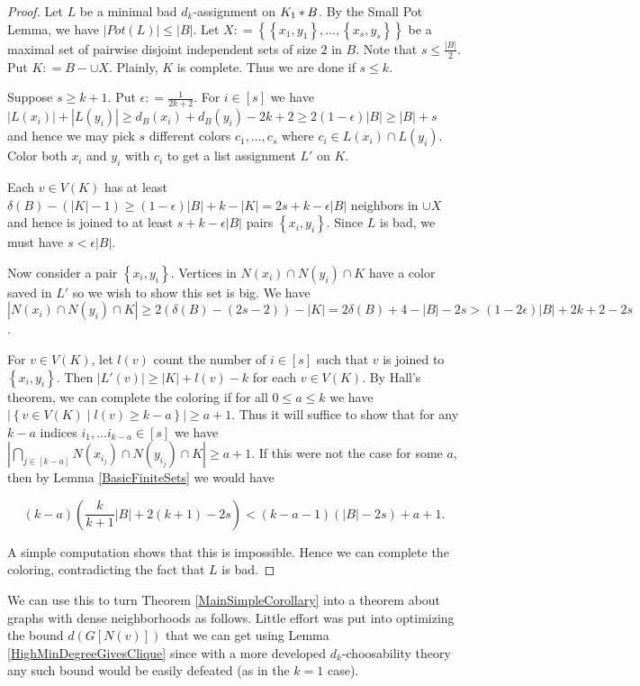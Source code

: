 \documentclass[12pt]{article}
\theoremstyle{plain}
\theoremstyle{definition}
\theoremstyle{remark}
\newcommand{\set}[1]{\left\{ #1 \right\}}
\newcommand{\setb}[3]{\left\{ #1 \in #2 \mid #3 \right\}}
\newcommand{\card}[1]{\left|#1\right|}
\newcommand{\irange}[1]{\left[#1\right]}
\newcommand{\join}[2]{#1 \mbox{\hspace{2 pt}$\ast$\hspace{2 pt}} #2}
\newcommand{\parens}[1]{\left( #1 \right)}
\newcommand{\DefinedAs}{\mathrel{\mathop:}=}
\begin{document}
\begin{proof}
Let $L$ be a minimal bad $d_k$-assignment on $\join{K_1}{B}$. By the Small Pot Lemma, we have $\card{Pot(L)} \leq \card{B}$. Let $X \DefinedAs \set{\set{x_1, y_1}, \ldots, \set{x_s, y_s}}$ be a maximal set of pairwise disjoint independent sets of size $2$ in $B$.  Note that $s \leq \frac{\card{B}}{2}$.  Put $K \DefinedAs B - \cup X$.  Plainly, $K$ is complete.  Thus we are done if $s \leq k$.

Suppose $s \geq k + 1$.  Put $\epsilon \DefinedAs \frac{1}{2k + 2}$. For $i \in \irange{s}$ we have $\card{L(x_i)} + \card{L(y_i)} \geq d_B(x_i) + d_B(y_i) - 2k + 2 \geq 2(1-\epsilon)\card{B} \geq \card{B} + s$ and hence we may pick $s$ different colors $c_1, \ldots, c_s$ where $c_i \in L(x_i) \cap L(y_i)$.  Color both $x_i$ and $y_i$ with $c_i$ to get a list assignment $L'$ on $K$.

Each $v \in V(K)$ has at least $\delta(B) - (\card{K} - 1) \geq (1-\epsilon)\card{B} + k - \card{K} = 2s + k - \epsilon\card{B}$ neighbors in $\cup X$ and hence is joined to at least $s + k - \epsilon\card{B}$ pairs $\set{x_i, y_i}$.  Since $L$ is bad, we must have $s < \epsilon\card{B}$.

Now consider a pair $\set{x_i, y_i}$.  Vertices in $N(x_i) \cap N(y_i) \cap K$ have a color saved in $L'$ so we wish to show this set is big.  We have $\card{N(x_i) \cap N(y_i) \cap K} \geq 2(\delta(B) - (2s - 2)) - \card{K} = 2\delta(B) + 4 - \card{B} - 2s > (1-2\epsilon)\card{B} + 2k+2 - 2s$.

For $v \in V(K)$, let $l(v)$ count the number of $i \in \irange{s}$ such that $v$ is joined to $\set{x_i, y_i}$.  Then $\card{L'(v)} \geq \card{K} + l(v) - k$ for each $v \in V(K)$.  By Hall's theorem, we can complete the coloring if for all $0 \leq a \leq k$ we have $\card{\setb{v}{V(K)}{l(v) \geq k - a}} \geq a + 1$.  Thus it will suffice to show that for any $k-a$ indices $i_1, \ldots i_{k-a} \in \irange{s}$ we have $\card{\bigcap_{j \in \irange{k-a}} N(x_{i_j}) \cap N(y_{i_j}) \cap K} \geq a+1$.  If this were not the case for some $a$, then by Lemma \ref{BasicFiniteSets} we would have

\[(k-a)\parens{\frac{k}{k+1}\card{B} + 2(k+1) - 2s} < (k-a-1)(\card{B} - 2s) + a + 1.\]

A simple computation shows that this is impossible.  Hence we can complete the coloring, contradicting the fact that $L$ is bad.
\end{proof}

We can use this to turn Theorem \ref{MainSimpleCorollary} into a theorem about graphs with dense neighborhoods as follows.  Little effort was put into optimizing the bound $d(G[N(v)])$ that we can get using Lemma \ref{HighMinDegreeGivesClique} since with a more developed $d_k$-choosability theory any such bound would be easily defeated (as in the $k=1$ case).
\end{document}
